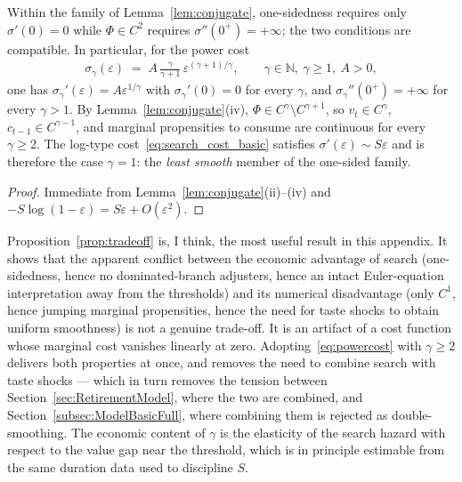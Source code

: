 \begin{proposition}
\label{prop:tradeoff}
Within the family of Lemma~\ref{lem:conjugate}, one-sidedness requires only
$\sigma'(0)=0$ while $\Phi\in C^{2}$ requires $\sigma''(0^{+})=+\infty$; the two
conditions are compatible. In particular, for the power cost
\begin{align}
\sigma_\gamma(\varepsilon) \;=\; A\,\frac{\gamma}{\gamma+1}\,\varepsilon^{(\gamma+1)/\gamma},
\qquad \gamma\in\mathbb{N},\ \gamma\ge 1,\ A>0,
\label{eq:powercost}
\end{align}
one has $\sigma_\gamma'(\varepsilon)=A\varepsilon^{1/\gamma}$ with $\sigma_\gamma'(0)=0$
for every $\gamma$, and $\sigma_\gamma''(0^{+})=+\infty$ for every $\gamma>1$. By
Lemma~\ref{lem:conjugate}(iv), $\Phi\in C^{\gamma}\setminus C^{\gamma+1}$, so
$v_t\in C^{\gamma}$, $c_{t-1}\in C^{\gamma-1}$, and marginal propensities to consume
are continuous for every $\gamma\ge 2$. The log-type
cost~\eqref{eq:search_cost_basic} satisfies $\sigma'(\varepsilon)\sim S\varepsilon$ and is
therefore the case $\gamma=1$: the \emph{least smooth} member of the one-sided family.
\end{proposition}

\begin{proof}
Immediate from Lemma~\ref{lem:conjugate}(ii)--(iv) and
$-S\log(1-\varepsilon)=S\varepsilon+O(\varepsilon^{2})$.
\end{proof}

Proposition~\ref{prop:tradeoff} is, I think, the most useful result in this appendix.
It shows that the apparent conflict between the economic advantage of search
(one-sidedness, hence no dominated-branch adjusters, hence an intact Euler-equation
interpretation away from the thresholds) and its numerical disadvantage (only $C^{1}$,
hence jumping marginal propensities, hence the need for taste shocks to obtain uniform
smoothness) is not a genuine trade-off. It is an artifact of a cost function whose
marginal cost vanishes linearly at zero. Adopting~\eqref{eq:powercost} with
$\gamma\ge2$ delivers both properties at once, and removes the need to combine search
with taste shocks --- which in turn removes the tension between
Section~\ref{sec:RetirementModel}, where the two are combined, and
Section~\ref{subsec:ModelBasicFull}, where combining them is rejected as
double-smoothing. The economic content of $\gamma$ is the elasticity of the search
hazard with respect to the value gap near the threshold, which is in principle
estimable from the same duration data used to discipline $S$.

